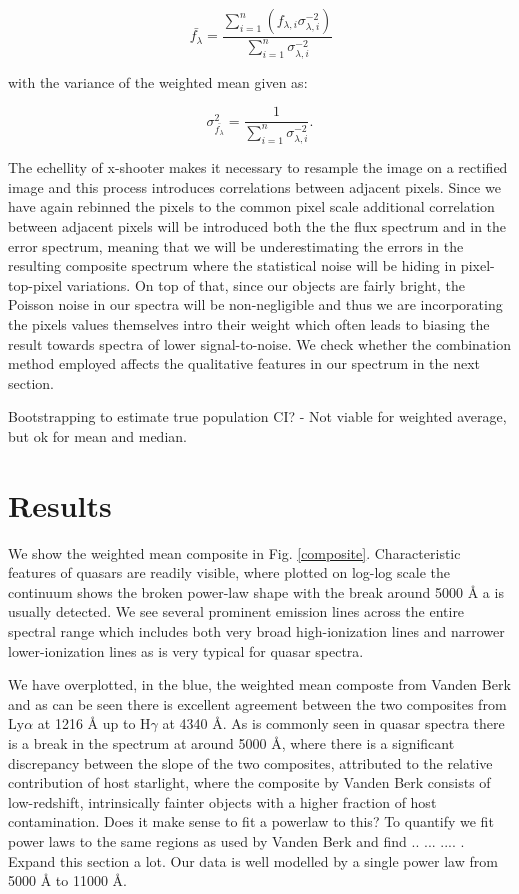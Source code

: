 \documentclass[iop]{emulateapj}
\begin{document}
\begin{equation}
\
\bar{f_{\lambda}} = \frac{ \sum_{i=1}^n \left( f_{\lambda, i} \sigma_{\lambda, i}^{-2} \right)}{\sum_{i=1}^n \sigma_{\lambda, i}^{-2}}
\end{equation}

 with the variance of the weighted mean given as: 
 
 \begin{equation}
 \sigma_{\bar{f_{\lambda}}}^2 = \frac{ 1 }{\sum_{i=1}^n \sigma_{\lambda, i}^{-2}}.
\end{equation}

The echellity of x-shooter makes it necessary to resample the image on a rectified image and this process introduces correlations between adjacent pixels. Since we have again rebinned the pixels to the common pixel scale additional correlation between adjacent pixels will be introduced both the the flux spectrum and in the error spectrum, meaning that we will be underestimating the errors in the resulting composite spectrum where the statistical noise will be hiding in pixel-top-pixel variations. On top of that, since our objects are fairly bright, the Poisson noise in our spectra will be non-negligible and thus we are incorporating the pixels values themselves intro their weight which often leads to biasing the result towards spectra of lower signal-to-noise. We check whether the combination method employed affects the qualitative features in our spectrum in the next section.

Bootstrapping to estimate true population CI? - Not viable for weighted average, but ok for mean and median. 




\section{Results}

We show the weighted mean composite in Fig. \ref{composite}. Characteristic features of quasars are readily visible, where plotted on log-log scale the continuum shows the broken power-law shape with the break around 5000 \r{A} a is usually detected. We see several prominent emission lines across the entire spectral range which includes both very broad high-ionization lines and narrower lower-ionization lines as is very typical for quasar spectra.  



 We have overplotted, in the blue, the weighted mean composte from Vanden Berk and as can be seen there is excellent agreement between the two composites from Ly$\alpha$ at 1216 \r{A} up to H$\gamma$ at 4340 \r{A}. As is commonly seen in quasar spectra there is a break in the spectrum at around 5000 \r{A}, where there is a significant discrepancy between the slope of the two composites, attributed to the relative contribution of host starlight, where the composite by Vanden Berk consists of low-redshift, intrinsically fainter objects with a higher fraction of host contamination. Does it make sense to fit a powerlaw to this? To quantify we fit power laws to the same regions as used by Vanden Berk and find .. ... .... . Expand this section a lot. Our data is well modelled by a single power law from 5000 \r{A} to 11000 \r{A}. 
 
\end{document}
